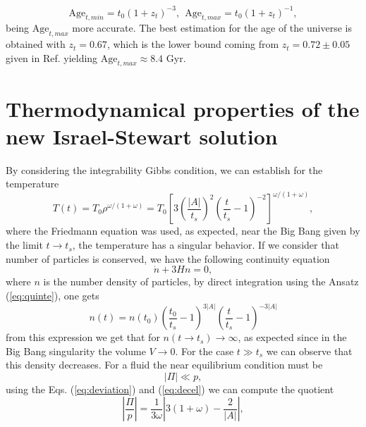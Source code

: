 \documentclass[twocolumn,showpacs,nofootinbib,floats,amsmath,amssymb]{revtex4}
\begin{document}
\begin{equation}
\mbox{Age}_{t,min} = t_{0}(1+z_{t})^{-3}, \ \ \mbox{Age}_{t,max} = t_{0}(1+z_{t})^{-1},
\end{equation}
being $\mbox{Age}_{t,max}$ more accurate. The best estimation for the age of the universe is obtained with $z_{t} = 0.67$, which is the lower bound coming from $z_{t} = 0.72 \pm 0.05$ given in Ref. \cite{38} yielding $\mbox{Age}_{t,max} \approx 8.4$ Gyr.\\  

\section{Thermodynamical properties of the new Israel-Stewart solution}
\label{sec:thermo}  
By considering the integrability Gibbs condition, we can establish for the temperature
\begin{equation}
T(t) = T_{0}\rho^{\omega/(1+\omega)} = T_{0} \left[3\left(\frac{\left| A\right|}{t_{s}}\right)^{2}\left(\frac{t}{t_{s}}-1 \right)^{-2}\right]^{\omega/(1+\omega)},
\label{eq:temp}
\end{equation}
where the Friedmann equation was used, as expected, near the Big Bang given by the limit $t\rightarrow t_{s}$, the temperature has a singular behavior. If we consider that number of particles is conserved, we have the following continuity equation
\begin{equation}
\dot{n}+3Hn = 0,
\end{equation}  
where $n$ is the number density of particles, by direct integration using the Ansatz (\ref{eq:quinte}), one gets
\begin{equation}
n(t) = n(t_{0})\left(\frac{t_{0}}{t_{s}}-1 \right)^{3\left|A\right|}\left(\frac{t}{t_{s}}-1 \right)^{-3\left|A\right|}
\end{equation}
from this expression we get that for $n(t \rightarrow t_{s}) \rightarrow \infty$, as expected since in the Big Bang singularity the volume $V \rightarrow 0$. For the case $t \gg t_{s}$ we can observe that this density decreases. For a fluid the near equilibrium condition must be
\begin{equation}
\left|\Pi\right| \ll p,
\label{eq:near}
\end{equation}
using the Eqs. (\ref{eq:deviation}) and (\ref{eq:decel}) we can compute the quotient
\begin{equation}
\left|\frac{\Pi}{p}\right| = \frac{1}{3\omega}\left|3(1+\omega)-\frac{2}{\left|A\right|} \right|,
\end{equation}
\end{document}
